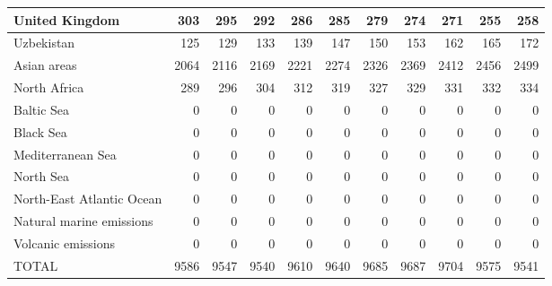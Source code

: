 \begin{table}
\begin{tabular}{|l|r|r|r|r|r|r|r|r|r|r|}
                United Kingdom&    303&    295&    292&    286&    285&    279&    274&    271&    255&    258\\\hline
                    Uzbekistan&    125&    129&    133&    139&    147&    150&    153&    162&    165&    172\\\hline
                   Asian areas&   2064&   2116&   2169&   2221&   2274&   2326&   2369&   2412&   2456&   2499\\\hline
                  North Africa&    289&    296&    304&    312&    319&    327&    329&    331&    332&    334\\\hline
                    Baltic Sea&      0&      0&      0&      0&      0&      0&      0&      0&      0&      0\\\hline
                     Black Sea&      0&      0&      0&      0&      0&      0&      0&      0&      0&      0\\\hline
             Mediterranean Sea&      0&      0&      0&      0&      0&      0&      0&      0&      0&      0\\\hline
                     North Sea&      0&      0&      0&      0&      0&      0&      0&      0&      0&      0\\\hline
     North-East Atlantic Ocean&      0&      0&      0&      0&      0&      0&      0&      0&      0&      0\\\hline
      Natural marine emissions&      0&      0&      0&      0&      0&      0&      0&      0&      0&      0\\\hline
            Volcanic emissions&      0&      0&      0&      0&      0&      0&      0&      0&      0&      0\\\hline\hline
                         TOTAL&   9586&   9547&   9540&   9610&   9640&   9685&   9687&   9704&   9575&   9541\\\hline
 \end{tabular}
 \end{table}
 
